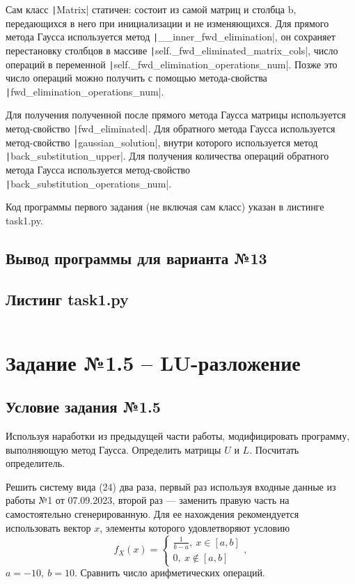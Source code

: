 Сам класс \texttt|Matrix| статичен: состоит из самой матриц и столбца b, передающихся в него при инициализации и не изменяющихся. Для прямого метода Гаусса используется метод \texttt|__inner_fwd_elimination|, он сохраняет перестановку столбцов в массиве \texttt|self._fwd_eliminated_matrix_cols|, число операций в переменной \texttt|self._fwd_elimination_operations_num|. Позже это число операций можно получить с помощью метода-свойства \texttt|fwd_elimination_operations_num|.

Для получения полученной после прямого метода Гаусса матрицы используется метод-свойство \texttt|fwd_eliminated|. Для обратного метода Гаусса используется метод-свойство \texttt|gaussian_solution|, внутри которого используется метод \texttt|back_substitution_upper|. Для получения количества операций обратного метода Гаусса используется метод-свойство \texttt|back_substitution_operations_num|.

Код программы первого задания (не включая сам класс) указан в листинге task1.py.
\subsection{Вывод программы для варианта №13}

\subsection{Листинг task1.py}
\inputminted{python}{code/task1.py}

\section{Задание №1.5 -- LU-разложение}
\subsection{Условие задания №1.5}
Используя наработки из предыдущей части работы, модифицировать
программу, выполняющую метод Гаусса. Определить матрицы $U$ и $L$.
Посчитать определитель.

Решить систему вида (24) два раза, первый раз используя входные
данные из работы №1 от 07.09.2023, второй раз — заменить правую часть
на самостоятельно сгенерированную. Для ее нахождения рекомендуется
использовать вектор $x$, элементы которого удовлетворяют условию
$$f_X(x) = \begin{cases}
   \frac1{b-a},\ x \in [a, b]
   \\
   0,\ x \notin [a,b]
 \end{cases},$$
$a=-10,\ b=10.$ Сравнить число арифметических операций.

